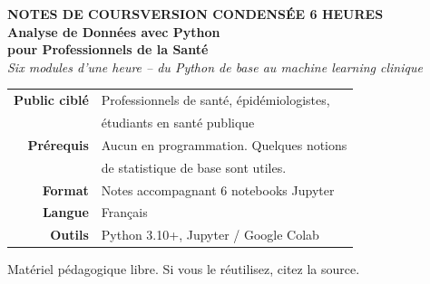 \documentclass[11pt,a4paper]{article}
\begin{document}

\thispagestyle{empty}
\vspace*{2cm}

\begin{center}

\begin{tcolorbox}[
  enhanced,
  colback=primary,
  colframe=primary,
  boxrule=0pt,
  arc=8pt,
  left=22pt,right=22pt,top=20pt,bottom=20pt,
  width=\linewidth,
]
\color{white}
\begin{flushleft}
{\small\sffamily\bfseries\uppercase{Notes de cours}\hfill\uppercase{Version condens\'ee 6 heures}}\\[12pt]
{\Huge\bfseries Analyse de Donn\'ees avec Python}\\[4pt]
{\LARGE\bfseries pour Professionnels de la Sant\'e}\\[18pt]
{\large\itshape Six modules d'une heure -- du Python de base au machine learning clinique}
\end{flushleft}
\end{tcolorbox}

\vspace{2.2cm}

\begin{tabular}{rl}
\bfseries Public cibl\'e   & Professionnels de sant\'e, \'epid\'emiologistes, \\
                           & \'etudiants en sant\'e publique \\[6pt]
\bfseries Pr\'erequis      & Aucun en programmation. Quelques notions \\
                           & de statistique de base sont utiles. \\[6pt]
\bfseries Format           & Notes accompagnant 6 notebooks Jupyter \\[6pt]
\bfseries Langue           & Fran\c{c}ais \\[6pt]
\bfseries Outils           & Python 3.10+, Jupyter / Google Colab \\
\end{tabular}

\vfill

{\small\color{gray!70}
Mat\'eriel p\'edagogique libre. Si vous le r\'eutilisez, citez la source.
}

\end{center}

\newpage
\end{document}

